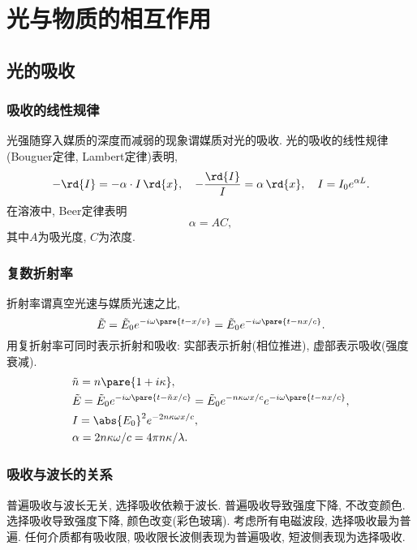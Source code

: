 \documentclass{ctexart}
\begin{document}
\section{光与物质的相互作用} %
\label{sec:光与物质的相互作用}

\subsection{光的吸收} %
\label{sub:光的吸收}

\subsubsection{吸收的线性规律} %
\label{ssub:吸收的线性规律}

光强随穿入媒质的深度而减弱的现象谓媒质对光的吸收. 光的吸收的线性规律(Bouguer定律, Lambert定律)表明,
\[ -\rd{I} = -\alpha \cdot I\,\rd{x},\quad -\frac{\rd{I}}{I} = \alpha\,\rd{x},\quad I=I_0 e^{\alpha L}. \]
在溶液中, Beer定律表明
\[ \alpha = AC, \]
其中$A$为吸光度, $C$为浓度.


\subsubsection{复数折射率} %
\label{ssub:复数折射率}

折射率谓真空光速与媒质光速之比,
\[ \tilde{E} = \tilde{E}_0 e^{-i\omega\pare{t-x/v}} = \tilde{E}_0 e^{-i\omega\pare{t-nx/c}}. \]
用复折射率可同时表示折射和吸收: 实部表示折射(相位推进), 虚部表示吸收(强度衰减).
\begin{align*}
    & \tilde{n} = n\pare{1+i\kappa}, \\
    & \tilde{E} = \tilde{E}_0 e^{-i\omega\pare{t-\tilde{n}x/c}} = \tilde{E}_0 e^{-n\kappa\omega x/c} e^{-i\omega\pare{t-nx/c}}, \\
    & I = \abs{E_0}^2 e^{-2n\kappa \omega x/c}, \\
    & \alpha = 2n\kappa\omega /c = 4\pi n\kappa/\lambda.
\end{align*}


\subsubsection{吸收与波长的关系} %
\label{ssub:吸收与波长的关系}

普遍吸收与波长无关, 选择吸收依赖于波长. 普遍吸收导致强度下降, 不改变颜色. 选择吸收导致强度下降, 颜色改变(彩色玻璃). 考虑所有电磁波段, 选择吸收最为普遍. 任何介质都有吸收限, 吸收限长波侧表现为普遍吸收, 短波侧表现为选择吸收.
\end{document}
